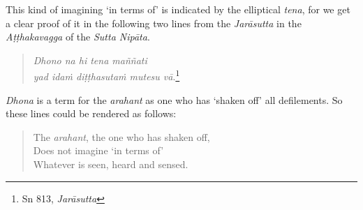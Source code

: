 This kind of imagining `in terms of' is indicated by the elliptical \emph{tena}, for we get a clear proof of it in the following two lines from the \emph{Jarāsutta} in the \emph{Aṭṭhakavagga} of the \emph{Sutta Nipāta}.

\begin{quote}
\emph{Dhono na hi tena maññati}\\
\emph{yad idaṁ diṭṭhasutaṁ mutesu vā}.\footnote{Sn 813, \emph{Jarāsutta}}
\end{quote}

\clearpage

\emph{Dhona} is a term for the \emph{arahant} as one who has `shaken off' all defilements. So these lines could be rendered as follows:

\begin{quote}
The \emph{arahant}, the one who has shaken off,\\
Does not imagine `in terms of'\\
Whatever is seen, heard and sensed.
\end{quote}
